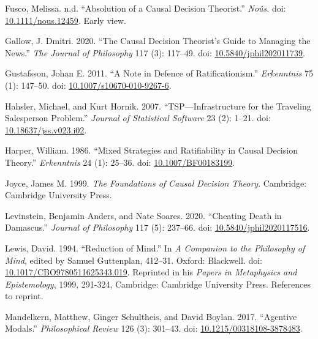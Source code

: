 \documentclass[
  11pt,
  letterpaper,
  DIV=11,
  numbers=noendperiod,
  twoside]{scrartcl}
\newlength{\cslhangindent}
\newenvironment{CSLReferences}[2] %
 {\begin{list}{}{%
  \setlength{\itemindent}{0pt}
  \setlength{\leftmargin}{0pt}
  \setlength{\parsep}{0pt}
  \ifodd #1
   \setlength{\leftmargin}{\cslhangindent}
   \setlength{\itemindent}{-1\cslhangindent}
  \fi
  \setlength{\itemsep}{#2\baselineskip}}}
 {\end{list}}
\begin{document}
\begin{CSLReferences}{1}{0}
Fusco, Melissa. n.d. {``Absolution of a Causal Decision Theorist.''}
\emph{No{û}s}. doi:
\href{https://doi.org/10.1111/nous.12459}{10.1111/nous.12459}. Early
view.

Gallow, J. Dmitri. 2020. {``The Causal Decision Theorist's Guide to
Managing the News.''} \emph{The Journal of Philosophy} 117 (3): 117--49.
doi:
\href{https://doi.org/10.5840/jphil202011739}{10.5840/jphil202011739}.

Gustafsson, Johan E. 2011. {``A Note in Defence of Ratificationism.''}
\emph{Erkenntnis} 75 (1): 147--50. doi:
\href{https://doi.org/10.1007/s10670-010-9267-6}{10.1007/s10670-010-9267-6}.

Hahsler, Michael, and Kurt Hornik. 2007. {``TSP---Infrastructure for the
Traveling Salesperson Problem.''} \emph{Journal of Statistical Software}
23 (2): 1--21. doi:
\href{https://doi.org/10.18637/jss.v023.i02}{10.18637/jss.v023.i02}.

Harper, William. 1986. {``Mixed Strategies and Ratifiability in Causal
Decision Theory.''} \emph{Erkenntnis} 24 (1): 25--36. doi:
\href{https://doi.org/10.1007/BF00183199}{10.1007/BF00183199}.

Joyce, James M. 1999. \emph{The Foundations of Causal Decision Theory}.
Cambridge: Cambridge University Press.

Levinstein, Benjamin Anders, and Nate Soares. 2020. {``Cheating Death in
Damascus.''} \emph{Journal of Philosophy} 117 (5): 237--66. doi:
\href{https://doi.org/10.5840/jphil2020117516}{10.5840/jphil2020117516}.

Lewis, David. 1994. {``Reduction of Mind.''} In \emph{A Companion to the
Philosophy of Mind}, edited by Samuel Guttenplan, 412--31. Oxford:
Blackwell. doi:
\href{https://doi.org/10.1017/CBO9780511625343.019}{10.1017/CBO9780511625343.019}.
Reprinted in his \emph{Papers in Metaphysics and Epistemology}, 1999,
291-324, Cambridge: Cambridge University Press. References to reprint.

Mandelkern, Matthew, Ginger Schultheis, and David Boylan. 2017.
{``Agentive Modals.''} \emph{Philosophical Review} 126 (3): 301--43.
doi:
\href{https://doi.org/10.1215/00318108-3878483}{10.1215/00318108-3878483}.


\end{CSLReferences}
\end{document}
